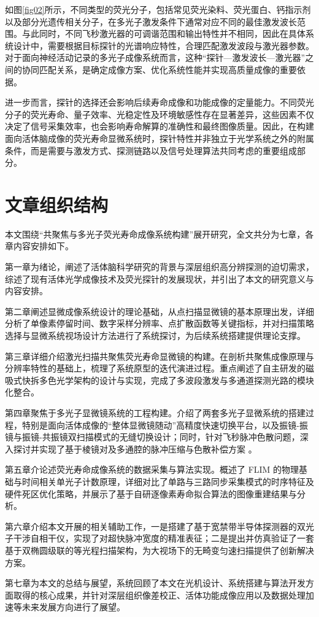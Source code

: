 如图\ref{fig02}所示，不同类型的荧光分子，包括常见荧光染料、荧光蛋白、钙指示剂以及部分光遗传相关分子，在多光子激发条件下通常对应不同的最佳激发波长范围。与此同时，不同飞秒激光器的可调谐范围和输出特性并不相同，因此在具体系统设计中，需要根据目标探针的光谱响应特性，合理匹配激发波段与激光器参数。对于面向神经活动记录的多光子成像系统而言，这种``探针—激发波长—激光器''之间的协同匹配关系，是确定成像方案、优化系统性能并实现高质量成像的重要依据。

进一步而言，探针的选择还会影响后续寿命成像和功能成像的定量能力。不同荧光分子的荧光寿命、量子效率、光稳定性及环境敏感性存在显著差异，这些因素不仅决定了信号采集效率，也会影响寿命解算的准确性和最终图像质量。因此，在构建面向活体脑成像的荧光寿命显微系统时，探针特性并非独立于光学系统之外的附属条件，而是需要与激发方式、探测链路以及信号处理算法共同考虑的重要组成部分。



\section{文章组织结构}\label{1.3}
本文围绕``共聚焦与多光子荧光寿命成像系统构建''展开研究，全文共分为七章，各章内容安排如下。

第一章为绪论，阐述了活体脑科学研究的背景与深层组织高分辨探测的迫切需求，综述了现有活体光学成像技术及荧光探针的发展现状，并引出了本文的研究意义与内容安排。

第二章阐述显微成像系统设计的理论基础，从点扫描显微镜的基本原理出发，详细分析了单像素停留时间、数字采样分辨率、点扩散函数等关键指标，并对扫描策略选择与显微系统视场设计方法进行了系统探讨，为后续系统搭建提供理论支撑。

第三章详细介绍激光扫描共聚焦荧光寿命显微镜的构建。在剖析共聚焦成像原理与分辨率特性的基础上，梳理了系统原型的迭代演进过程。重点阐述了自主研发的磁吸式快拆多色光学架构的设计与实现，完成了多波段激发与多通道探测光路的模块化整合。

第四章聚焦于多光子显微镜系统的工程构建。介绍了两套多光子显微系统的搭建过程，特别是面向活体成像的``整体显微镜随动''高精度快速切换平台，以及振镜-振镜与振镜-共振镜双扫描模式的无缝切换设计；同时，针对飞秒脉冲色散问题，深入探讨并实现了基于棱镜对及多通腔的脉冲压缩与色散补偿方案 。

第五章介论述荧光寿命成像系统的数据采集与算法实现。概述了 FLIM 的物理基础与时间相关单光子计数原理，详细对比了单路与三路同步采集模式的时序特征及硬件死区优化策略，并展示了基于自研逐像素寿命拟合算法的图像重建结果与分析。

第六章介绍本文开展的相关辅助工作，一是搭建了基于宽禁带半导体探测器的双光子干涉自相干仪，实现了对超快脉冲宽度的精准表征；二是提出并仿真验证了一套基于双椭圆级联的等光程扫描架构，为大视场下的无畸变匀速扫描提供了创新解决方案。

第七章为本文的总结与展望，系统回顾了本文在光机设计、系统搭建与算法开发方面取得的核心成果，并针对深层组织像差校正、活体功能成像应用以及数据处理加速等未来发展方向进行了展望。